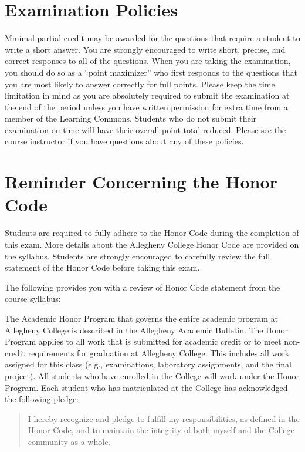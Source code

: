 \section*{Examination Policies}

\vspace*{-.05in} \noindent Minimal partial credit may be awarded for the questions that require a student to write a
short answer. You are strongly encouraged to write short, precise, and correct responses to all of the questions. When
you are taking the examination, you should do so as a ``point maximizer'' who first responds to the questions that you
are most likely to answer correctly for full points. Please keep the time limitation in mind as you are absolutely
required to submit the examination at the end of the period unless you have written permission for extra time from a
member of the Learning Commons. Students who do not submit their examination on time will have their overall point total
reduced. Please see the course instructor if you have questions about any of these policies.

\vspace*{-.15in}
\section*{Reminder Concerning the Honor Code}

\noindent Students are required to fully adhere to the Honor Code during the completion of this exam. More details about
the Allegheny College Honor Code are provided on the syllabus. Students are strongly encouraged to carefully review the
full statement of the Honor Code before taking this exam.

\noindent The following provides you with a review of Honor Code statement from the course syllabus:

The Academic Honor Program that governs the entire academic program at Allegheny College is described in the Allegheny
Academic Bulletin.  The Honor Program applies to all work that is submitted for academic credit or to meet non-credit
requirements for graduation at Allegheny College.  This includes all work assigned for this class (e.g., examinations,
laboratory assignments, and the final project).  All students who have enrolled in the College will work under the Honor
Program.  Each student who has matriculated at the College has acknowledged the following pledge:

\vspace*{-.11in}
\begin{quote}
  I hereby recognize and pledge to fulfill my responsibilities, as defined in the Honor Code, and to maintain the
  integrity of both myself and the College community as a whole.
\end{quote}
\vspace*{-.11in}

